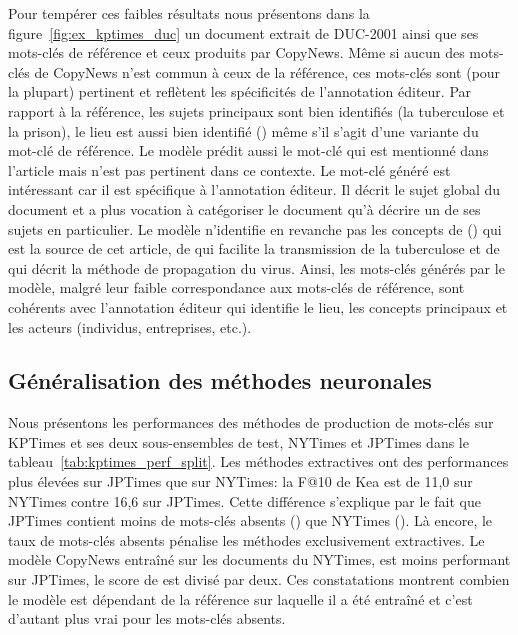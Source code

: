 Pour tempérer ces faibles résultats nous présentons dans la figure~\ref{fig:ex_kptimes_duc} un document extrait de DUC-2001 ainsi que ses mots-clés de référence et ceux produits par CopyNews.
Même si aucun des mots-clés de CopyNews n'est commun à ceux de la référence, ces mots-clés sont (pour la plupart) pertinent et reflètent les spécificités de l'annotation éditeur.
Par rapport à la référence, les sujets principaux sont bien identifiés (la tuberculose et la prison), le lieu est aussi bien identifié () même s'il s'agit d'une variante du mot-clé de référence. Le modèle prédit aussi le mot-clé  qui est mentionné dans l'article mais n'est pas pertinent dans ce contexte.
%
Le mot-clé généré  est intéressant car il est spécifique à l'annotation éditeur. Il décrit le sujet global du document et a plus vocation à catégoriser le document qu'à décrire un de ses sujets en particulier.
Le modèle n'identifie en revanche pas les concepts de  () qui est la source de cet article, de  qui facilite la transmission de la tuberculose et de  qui décrit la méthode de propagation du virus.
Ainsi, les mots-clés générés par le modèle, malgré leur faible correspondance aux mots-clés de référence, sont cohérents avec l'annotation éditeur qui identifie le lieu, les concepts principaux et les acteurs (individus, entreprises, etc.).



\subsection{Généralisation des méthodes neuronales}
\label{sub:kptimes_generalisation}

Nous présentons les performances des méthodes de production de mots-clés sur KPTimes et ses deux sous-ensembles de test, NYTimes et JPTimes dans le tableau~\ref{tab:kptimes_perf_split}.
Les méthodes extractives ont des performances plus élevées sur JPTimes que sur NYTimes: la F@10 de Kea est de 11,0 sur NYTimes contre 16,6 sur JPTimes.
Cette différence s'explique par le fait que JPTimes contient moins de mots-clés absents () que NYTimes ().
Là encore, le taux de mots-clés absents  pénalise les méthodes exclusivement extractives.
Le modèle CopyNews entraîné sur les documents du NYTimes, est moins performant sur JPTimes, le score de \map{} est divisé par deux. Ces constatations montrent combien le modèle est dépendant de la référence sur laquelle il a été entraîné et c'est d'autant plus vrai pour les mots-clés absents. 

